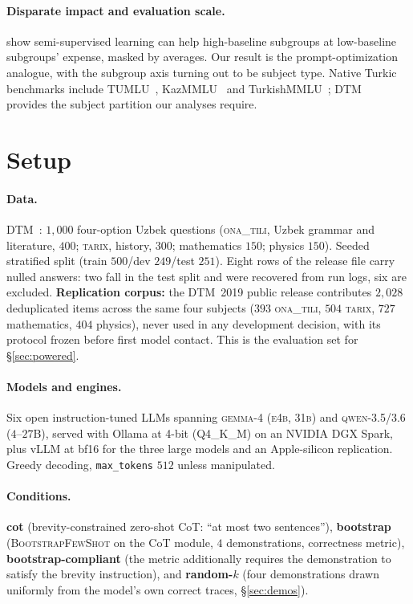 \documentclass[11pt]{article}
\newcommand{\ona}{\textsc{ona\_tili}}
\newcommand{\tarix}{\textsc{tarix}}
\newcommand{\bsfs}{\textsc{BootstrapFewShot}}
\begin{document}
\paragraph{Disparate impact and evaluation scale.} \citet{zhu2022rich} show
semi-supervised learning can help high-baseline subgroups at low-baseline subgroups'
expense, masked by averages. Our result is the prompt-optimization analogue, with the
subgroup axis turning out to be subject type. Native Turkic benchmarks include
TUMLU~\citep{tumlu2025}, KazMMLU~\citep{kazmmlu2025} and
TurkishMMLU~\citep{turkishmmlu2024}; DTM~\citep{dtm2026} provides the subject partition
our analyses require.

\section{Setup}\label{sec:setup}
\paragraph{Data.} DTM~\citep{dtm2026}: $1{,}000$ four-option Uzbek questions
(\ona{}, Uzbek grammar and literature, $400$; \tarix{}, history, $300$; mathematics
$150$; physics $150$). Seeded stratified split (train $500$/dev $249$/test $251$).
Eight rows of the release file carry nulled answers: two fall in the test split and were
recovered from run logs, six are excluded. \textbf{Replication corpus:} the DTM~2019
public release contributes $2{,}028$ deduplicated items across the same four subjects
($393$ \ona{}, $504$ \tarix{}, $727$ mathematics, $404$ physics), never used in any
development decision, with its protocol frozen before first model contact. This is the
evaluation set for \S\ref{sec:powered}.
\paragraph{Models and engines.} Six open instruction-tuned LLMs spanning
\textsc{gemma-4} (\textsc{e4b}, \textsc{31b}) and \textsc{qwen-3.5/3.6} ($4$--$27$B),
served with Ollama at 4-bit (Q4\_K\_M) on an NVIDIA DGX Spark, plus vLLM at bf16 for the
three large models and an Apple-silicon replication. Greedy decoding,
\texttt{max\_tokens} $512$ unless manipulated.
\paragraph{Conditions.} \textbf{cot} (brevity-constrained zero-shot CoT: ``at most two
sentences''), \textbf{bootstrap} (\bsfs{} on the CoT module, $4$ demonstrations,
correctness metric), \textbf{bootstrap-compliant} (the metric additionally requires the
demonstration to satisfy the brevity instruction), and \textbf{random-$k$} (four
demonstrations drawn uniformly from the model's own correct traces, \S\ref{sec:demos}).
\end{document}
